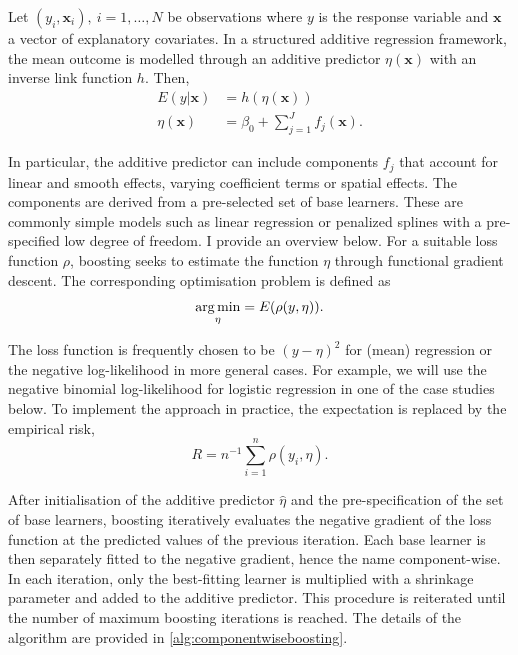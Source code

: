 Let $(y_i, \mathbf{x}_i), \: i = 1, \dots, N$ be observations where $y$ is the response variable and $\mathbf{x}$ a vector of explanatory covariates. In a structured additive regression framework, the mean outcome is modelled through an additive predictor $\eta(\mathbf{x})$ with an inverse link function $h$. Then,
\begin{align*}
	E(y \vert \mathbf{x}) &= h(\eta(\mathbf{x})) \\
		\eta (\mathbf{x}) &= \beta_0 + \sum_{j = 1}^{J} f_j(\mathbf{x}).
\end{align*}

In particular, the additive predictor can include components $f_j$ that account for linear and smooth effects, varying coefficient terms or spatial effects. The components are derived from a pre-selected set of base learners. These are commonly simple models such as linear regression or penalized splines with a pre-specified low degree of freedom. I provide an overview below. For a suitable loss function $\rho$, boosting seeks to estimate the function $\eta$ through functional gradient descent. The corresponding optimisation problem is defined as
\begin{equation*}
	\operatorname*{arg\,min}_{\eta} = E ( \rho (y, \eta)).
\end{equation*}

The loss function is frequently chosen to be $(y-\eta)^2$ for (mean) regression or the negative log-likelihood in more general cases. For example, we will use the negative binomial log-likelihood for logistic regression in one of the case studies below. To implement the approach in practice, the expectation is replaced by the empirical risk, 
\begin{equation*}
	R = n^{-1} \sum_{i = 1}^{n} \rho(y_i, \eta).
\end{equation*}

After initialisation of the additive predictor $\hat{\eta}$ and the pre-specification of the set of base learners, boosting iteratively evaluates the negative gradient of the loss function at the predicted values of the previous iteration. Each base learner is then separately fitted to the negative gradient, hence the name component-wise. In each iteration, only the best-fitting learner is multiplied with a shrinkage parameter and added to the additive predictor. This procedure is reiterated until the number of maximum boosting iterations is reached. The details of the algorithm are provided in \autoref{alg:componentwiseboosting}.

